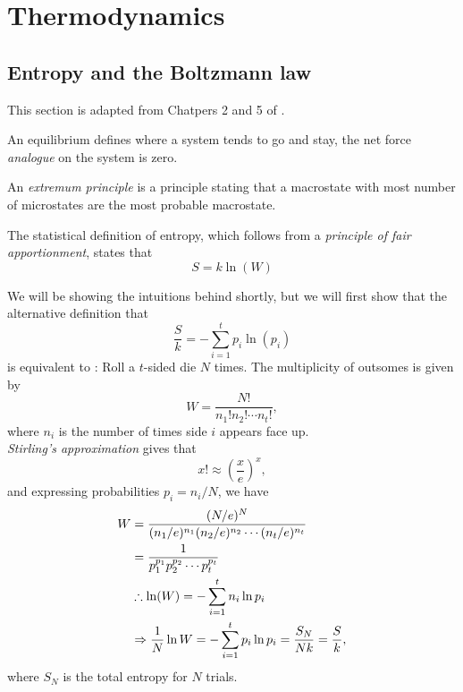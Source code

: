 \chapter{Thermodynamics}
\section{Entropy and the Boltzmann law} 
\label{chapter1}
This section is adapted from Chatpers 2 and 5 of \cite{dill}. 
\begin{defi}[Equilibrium]
An equilibrium defines where a system tends to go and stay, \ie the net force \textit{analogue} on the system is zero. 
\end{defi}
\begin{defi}
An \textit{extremum principle} is a principle stating that a macrostate with most number of microstates are the most probable macrostate. 
\end{defi}
\begin{post}
\label{entropy}
The statistical definition of entropy, which follows from a \textit{principle of fair apportionment}, states that 
\begin{equation}
\label{eq:entr}
S=k\ln(W)
\end{equation}
\end{post}
We will be showing the intuitions behind  shortly, but we will first show that the alternative definition that 
\begin{equation}
\frac{S}{k}=-\sum^t_{i=1}p_i\ln(p_i)
\end{equation}
is equivalent to : 
Roll a $t$-sided die $N$ times. The multiplicity of outsomes is given by 
\begin{equation}
W=\frac{N!}{n_1!n_2!\cdots n_t!}, 
\end{equation}
where $n_i$ is the number of times side $i$ appears face up. \\
\textit{Stirling's approximation} gives that 
\begin{equation}
x!\approx\left(\frac{x}{e}\right)^x, 
\end{equation}
and expressing probabilities $p_i=n_i/N$, we have
\begin{equation}
\begin{aligned}
W&=\frac{(N/e)^N}{(n_1/e)^{n_1}(n_2/e)^{n_2}\cdots (n_t/e)^{n_t}} \\
&=\frac{1}{p_1^{p_1}p_2^{p_2}\cdots p_t^{p_t}}\\
&\therefore\ln(W)=-\sum^{t}_{i=1}n_i\ln{p_i} \\
&\Rightarrow\frac{1}{N}\ln{W}=-\sum^{t}_{i=1}p_i\ln{p_i}=\frac{S_N}{Nk}=\frac{S}{k}, 
\end{aligned}
\end{equation}
where $S_N$ is the total entropy for $N$ trials. 

